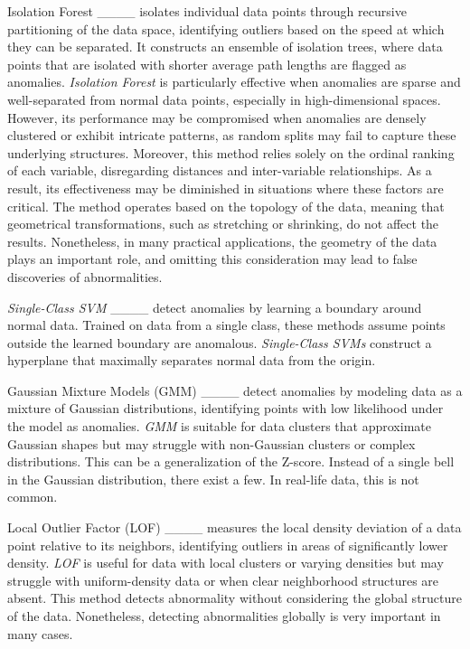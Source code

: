 Isolation Forest ____ isolates individual data points through recursive partitioning of the data space, identifying outliers based on the speed at which they can be separated. It constructs an ensemble of isolation trees, where data points that are isolated with shorter average path lengths are flagged as anomalies. \textit{Isolation Forest} is particularly effective when anomalies are sparse and well-separated from normal data points, especially in high-dimensional spaces. However, its performance may be compromised when anomalies are densely clustered or exhibit intricate patterns, as random splits may fail to capture these underlying structures. Moreover, this method relies solely on the ordinal ranking of each variable, disregarding distances and inter-variable relationships. As a result, its effectiveness may be diminished in situations where these factors are critical. The method operates based on the topology of the data, meaning that geometrical transformations, such as stretching or shrinking, do not affect the results. Nonetheless, in many practical applications, the geometry of the data plays an important role, and omitting this consideration may lead to false discoveries of abnormalities.

\textit{Single-Class SVM} ____ detect anomalies by learning a boundary around normal data. Trained on data from a single class, these methods assume points outside the learned boundary are anomalous. \textit{Single-Class SVMs} construct a hyperplane that maximally separates normal data from the origin.

Gaussian Mixture Models (GMM) ____ detect anomalies by modeling data as a mixture of Gaussian distributions, identifying points with low likelihood under the model as anomalies. \textit{GMM} is suitable for data clusters that approximate Gaussian shapes but may struggle with non-Gaussian clusters or complex distributions. This can be a generalization of the Z-score. Instead of a single bell in the Gaussian distribution, there exist a few. In real-life data, this is not common. 

Local Outlier Factor (LOF) ____ measures the local density deviation of a data point relative to its neighbors, identifying outliers in areas of significantly lower density. \textit{LOF} is useful for data with local clusters or varying densities but may struggle with uniform-density data or when clear neighborhood structures are absent. This method detects abnormality without considering the global structure of the data. Nonetheless, detecting abnormalities globally is very important in many cases. 

